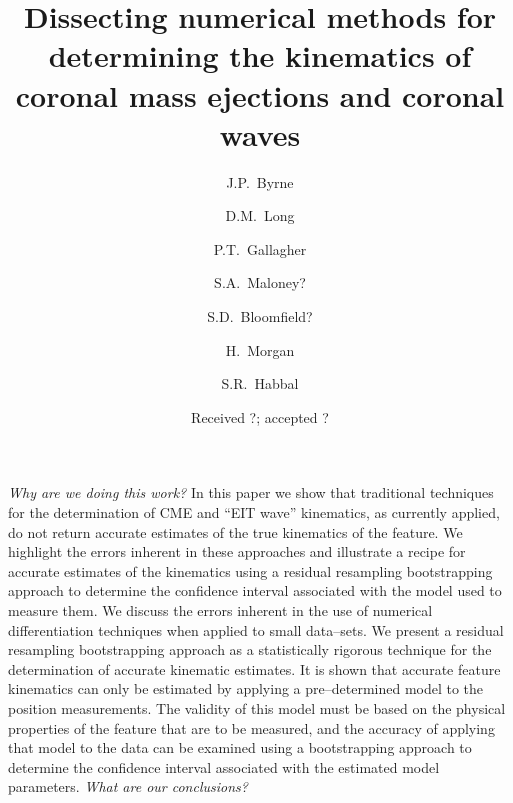 \documentclass[structabstract]{aa}
\begin{document}
\title{Dissecting numerical methods for determining the kinematics of coronal mass ejections and coronal waves}


\author{J.P.~Byrne
	\and D.M.~Long
	\and P.T.~Gallagher
	\and S.A.~Maloney?
	\and S.D.~Bloomfield?
	\and H.~Morgan
	\and S.R.~Habbal}

\date{Received ?; accepted ?}
\abstract
{\emph{Why are we doing this work?} }
{In this paper we show that traditional techniques for the determination of CME and ``EIT wave'' kinematics, as currently applied, do not return accurate estimates of the true kinematics of the feature. We highlight the errors inherent in these approaches and illustrate a recipe for accurate estimates of the kinematics using a residual resampling bootstrapping approach to determine the confidence interval associated with the model used to measure them.}
{We discuss the errors inherent in the use of numerical differentiation techniques when applied to small data--sets. We present a residual resampling bootstrapping approach as a statistically rigorous technique for the determination of accurate kinematic estimates.}
{It is shown that accurate feature kinematics can only be estimated by applying a pre--determined model to the position measurements. The validity of this model must be based on the physical properties of the feature that are to be measured, and the accuracy of applying that model to the data can be examined using a bootstrapping approach to determine the confidence interval associated with the estimated model parameters.}
{\emph{What are our conclusions?}}


\end{document}
